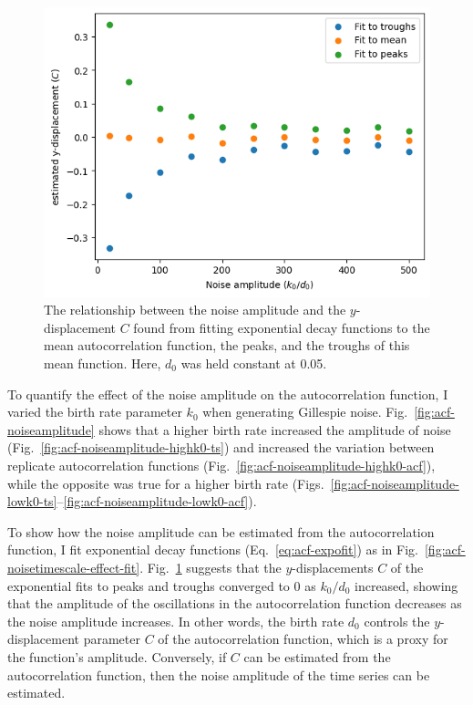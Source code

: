 \begin{figure}
  \centering
  \includegraphics[width=0.6\linewidth]{birthrate_vs_ydispl.png}
  \caption[
    Quantifying the effect of Gillespie noise amplitude on the autocorrelation function
  ]{
    The relationship between the noise amplitude and the $y$-displacement $C$ found from fitting exponential decay functions to the mean autocorrelation function, the peaks, and the troughs of this mean function.
    Here, $d_{0}$ was held constant at 0.05.
  }
  \label{fig:acf-noiseamplitude-effect}
\end{figure}


To quantify the effect of the noise amplitude on the autocorrelation function, I varied the birth rate parameter $k_{0}$ when generating Gillespie noise.
Fig.\ \ref{fig:acf-noiseamplitude} shows that a higher birth rate increased the amplitude of noise (Fig.\ \ref{fig:acf-noiseamplitude-highk0-ts}) and increased the variation between replicate autocorrelation functions (Fig.\ \ref{fig:acf-noiseamplitude-highk0-acf}), while the opposite was true for a higher birth rate (Figs.\ \ref{fig:acf-noiseamplitude-lowk0-ts}--\ref{fig:acf-noiseamplitude-lowk0-acf}).

To show how the noise amplitude can be estimated from the autocorrelation function, I fit exponential decay functions (Eq.\ \ref{eq:acf-expofit}) as in Fig.\ \ref{fig:acf-noisetimescale-effect-fit}.
Fig.\ \ref{fig:acf-noiseamplitude-effect} suggests that the $y$-displacements $C$ of the exponential fits to peaks and troughs converged to 0 as $k_{0}/d_{0}$ increased, showing that the amplitude of the oscillations in the autocorrelation function decreases as the noise amplitude increases.
In other words, the birth rate $d_{0}$ controls the $y$-displacement parameter $C$ of the autocorrelation function, which is a proxy for the function's amplitude.
Conversely, if $C$ can be estimated from the autocorrelation function, then the noise amplitude of the time series can be estimated.


